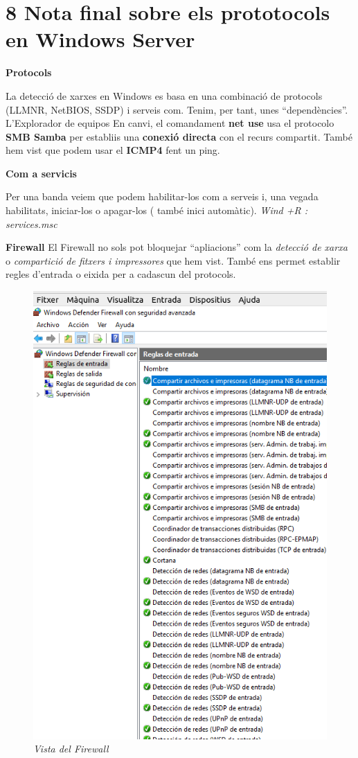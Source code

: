 \documentclass[
  a4paper,
]{article}
\begin{document}
\section{8 Nota final sobre els prototocols en Windows
Server}\label{nota-final-sobre-els-prototocols-en-windows-server}

\textbf{Protocols}

La detecció de xarxes en Windows es basa en una combinació de protocols
(LLMNR, NetBIOS, SSDP) i serveis com. Tenim, per tant, unes
``dependències''. L'Explorador de equipos En canvi, el comandament
\textbf{net use} usa el protocolo \textbf{SMB Samba} per establiis una
\textbf{conexió directa} con el recurs compartit. També hem vist que
podem usar el \textbf{ICMP4} fent un ping.

\textbf{Com a servicis}

Per una banda veiem que podem habilitar-los com a serveis i, una vegada
habilitats, iniciar-los o apagar-los ( també inici automàtic).
\emph{Wind +R : services.msc}

\textbf{Firewall} El Firewall no sols pot bloquejar ``apliacions'' com
la \emph{detecció de xarxa} o \emph{compartició de fitxers i
impressores} que hem vist. També ens permet establir regles d'entrada o
eixida per a cadascun del protocols.

\begin{figure}
\centering
\includegraphics{png/ADDS/ExemplesEnFirewall.png}
\caption{\emph{Vista del Firewall}}
\end{figure}
\end{document}
